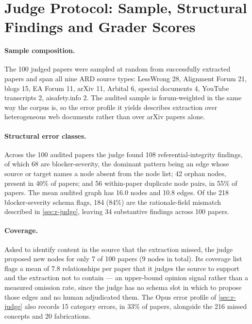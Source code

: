 \documentclass[10pt,twocolumn,letterpaper]{article}
\begin{document}
\section{Judge Protocol: Sample, Structural Findings and Grader Scores}
\label{app:judge}

\paragraph{Sample composition.} The 100 judged papers were sampled at random from
successfully extracted papers and span all nine ARD source types: LessWrong 28,
Alignment Forum 21, blogs 15, EA Forum 11, arXiv 11, Arbital 6, special documents 4,
YouTube transcripts 2, aisafety.info 2. The audited sample is forum-weighted in the same
way the corpus is, so the error profile it yields describes extraction over heterogeneous
web documents rather than over arXiv papers alone.

\paragraph{Structural error classes.} Across the 100 audited papers the judge found 108
referential-integrity findings, of which 68 are blocker-severity, the dominant pattern
being an edge whose source or target names a node absent from the node list; 42 orphan
nodes, present in 40\% of papers; and 56 within-paper duplicate node pairs, in 55\% of
papers. The mean audited graph has 16.0 nodes and 10.8 edges. Of the 218
blocker-severity schema flags, 184 (84\%) are the rationale-field mismatch described in
\cref{sec:r-judge}, leaving 34 substantive findings across 100 papers.

\paragraph{Coverage.} Asked to identify content in the source that the extraction missed,
the judge proposed new nodes for only 7 of 100 papers (9 nodes in total). Its coverage
list flags a mean of 7.8 relationships per paper that it judges the source to support and
the extraction not to contain --- an upper-bound opinion signal rather than a measured
omission rate, since the judge has no schema slot in which to propose those edges and no
human adjudicated them. The Opus error profile of \cref{sec:r-judge} also records 15
category errors, in 33\% of papers, alongside the 216 missed concepts and 20 fabrications.
\end{document}
